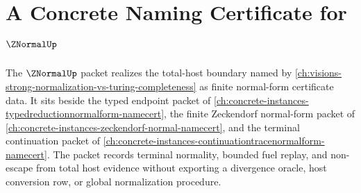 \chapter{A Concrete Naming Certificate for $\ZNormalUp$}
\label{ch:concrete-instances-znormal-namecert}

The $\ZNormalUp$ packet realizes the total-host boundary named by \autoref{ch:visions-strong-normalization-vs-turing-completeness} as finite normal-form certificate data. It sits beside the typed endpoint packet of \autoref{ch:concrete-instances-typedreductionnormalform-namecert}, the finite Zeckendorf normal-form packet of \autoref{ch:concrete-instances-zeckendorf-normal-namecert}, and the terminal continuation packet of \autoref{ch:concrete-instances-continuationtracenormalform-namecert}. The packet records terminal normality, bounded fuel replay, and non-escape from total host evidence without exporting a divergence oracle, host conversion row, or global normalization procedure.



